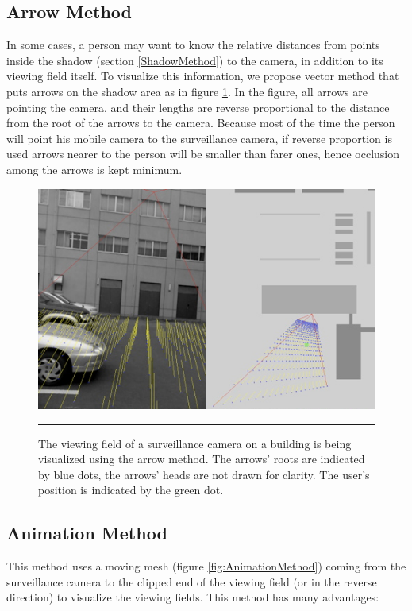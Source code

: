 \subsection{Arrow Method}

In some cases, a person may want to know the relative distances from points inside the shadow (section \ref{ShadowMethod}) to the camera, in addition to its viewing field itself. To visualize this information, we propose vector method that puts arrows on the shadow area as in figure \ref{fig:ArrowMethod}. In the figure, all arrows are pointing the camera, and their lengths are reverse proportional to the distance from the root of the arrows to the camera. Because most of the time the person will point his mobile camera to the surveillance camera, if reverse proportion is used arrows nearer to the person will be smaller than farer ones, hence occlusion among the arrows is kept minimum.

\begin{figure}[htbp]
	\centering
	\includegraphics[width=14cm]{./Primitives/theory_arrow.png}
	\rule{35em}{0.5pt}
	\caption[Arrow method]{The viewing field of a surveillance camera on a building is being visualized using the arrow method. The arrows' roots are indicated by blue dots, the arrows' heads are not drawn for clarity. The user's position is indicated by the green dot.}
	\label{fig:ArrowMethod}
\end{figure}

\subsection{Animation Method}

This method uses a moving mesh (figure \ref{fig:AnimationMethod}) coming from the surveillance camera to the clipped end of the viewing field (or in the reverse direction) to visualize the viewing fields. This method has  many advantages:


